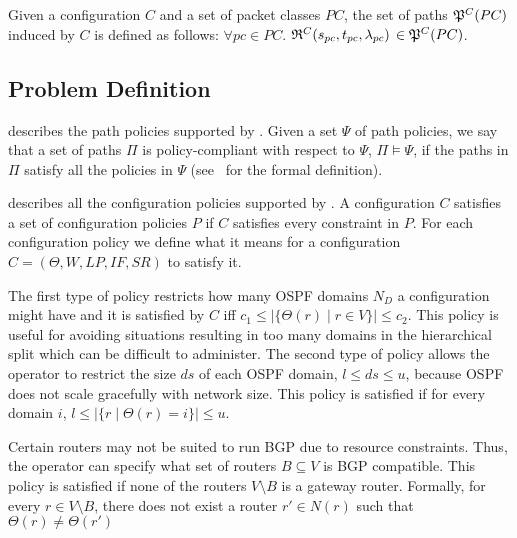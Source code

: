 \begin{definition}
Given a configuration $C$ and a set of packet classes $PC$, the set of paths
$\mathfrak{P}^C(PC)$ induced by $C$ is defined as follows: 
$\forall pc \in PC.$ $\mathfrak{R}^C(s_{pc}, t_{pc}, \lambda_{pc})$ $\in \mathfrak{P}^C(PC)$.
\end{definition}

\subsection{Problem Definition}



 describes the path policies supported by \name.
Given  a set $\Psi$ of
path policies, we say that
a set of paths $\Pi$ is policy-compliant with respect to $\Psi$, $\Pi \models \Psi$,
if the paths in $\Pi$ satisfy all the policies in $\Psi$ (see~\cite{genesis} for the formal definition). 


 describes all the configuration policies supported by \name.
A configuration $C$ satisfies a set of configuration policies $P$
if $C$ satisfies every constraint in $P$.
For each configuration policy 
we define what it means for  a configuration $C=(\Theta,W,LP,IF,SR)$ to satisfy it.

The first type of policy restricts how many OSPF domains $N_D$ a
configuration might have
and it is satisfied by $C$ iff $c_1\leq |\{\Theta(r)\mid r\in V\}|\leq
c_2$.  This policy is useful for avoiding situations resulting in too
many domains in the hierarchical split which can be difficult to
administer.  The second type of policy allows the operator to restrict
the size $ds$ of each OSPF domain, $l\leq ds\leq u$, because OSPF does
not scale gracefully with network size.  This policy is satisfied if
for every domain $i$, $l\leq |\{r \mid \Theta(r)=i\}|\leq u$.


Certain 
	routers may not be suited to run BGP due to resource
	constraints. Thus, the operator can specify what set of 
	routers $B\subseteq V$ is BGP compatible.  
	This policy is satisfied if none of the routers $V\setminus B$
	is a gateway router.
	Formally, for every $r\in V\setminus B$,
	there does not exist a router $r'\in N(r)$ such that $\Theta(r) \not= \Theta(r')$

